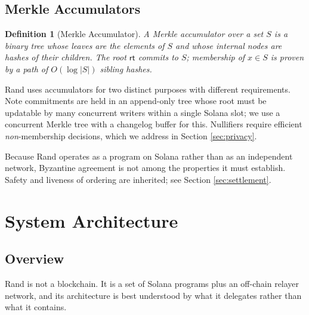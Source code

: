\documentclass[11pt,a4paper]{article}
\newtheorem{definition}[theorem]{Definition}
\begin{document}
\subsection{Merkle Accumulators}

\begin{definition}[Merkle Accumulator]
A Merkle accumulator over a set $S$ is a binary tree whose leaves are the elements of $S$ and whose internal nodes are hashes of their children. The root $\mathsf{rt}$ commits to $S$; membership of $x \in S$ is proven by a path of $O(\log |S|)$ sibling hashes.
\end{definition}

Rand uses accumulators for two distinct purposes with different requirements. Note commitments are held in an append-only tree whose root must be updatable by many concurrent writers within a single Solana slot; we use a concurrent Merkle tree with a changelog buffer for this. Nullifiers require efficient \emph{non}-membership decisions, which we address in Section \ref{sec:privacy}.

Because Rand operates as a program on Solana rather than as an independent network, Byzantine agreement is not among the properties it must establish. Safety and liveness of ordering are inherited; see Section \ref{sec:settlement}.

\section{System Architecture}
\label{sec:architecture}

\subsection{Overview}

Rand is not a blockchain. It is a set of Solana programs plus an off-chain relayer network, and its architecture is best understood by what it delegates rather than what it contains.
\end{document}
